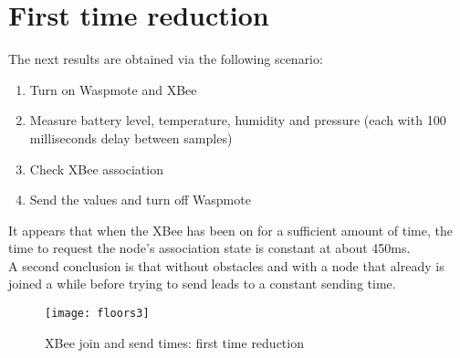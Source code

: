 \section{First time reduction}
The next results are obtained via the following scenario:
\begin{enumerate}
\item Turn on Waspmote and XBee
\item Measure battery level, temperature, humidity and pressure (each with 100 milliseconds delay between samples)
\item Check XBee association
\item Send the values and turn off Waspmote
\end{enumerate} 
It appears that when the XBee has been on for a sufficient amount of time, the time to request the node's association state is constant at about 450ms.\\
A second conclusion is that without obstacles and with a node that already is joined a while before trying to send leads to a constant sending time.\\  \bigskip \bigskip
\hspace{5cm}
\begin{figure}[htbp]
\centering
\texttt{[image: floors3]}
\caption[XBee join and send times: first time reduction]{XBee join and send times: first time reduction}
\label{fig:floors3}
\end{figure} 
